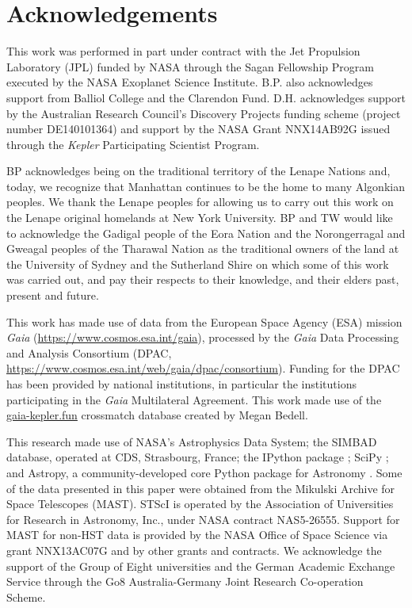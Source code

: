 \documentclass[a4paper,fleqn,usenatbib]{mnras}
\begin{document}
\section*{Acknowledgements} %

This work was performed in part under contract with the Jet Propulsion Laboratory (JPL) funded by NASA through the Sagan Fellowship Program executed by the NASA Exoplanet Science Institute. B.P. also acknowledges support from Balliol College and the Clarendon Fund. D.H. acknowledges support by the Australian Research Council's Discovery Projects funding scheme (project number DE140101364) and support by the NASA Grant NNX14AB92G issued through the \emph{Kepler} Participating Scientist Program.

BP acknowledges being on the traditional territory of the Lenape Nations and, today, we recognize that Manhattan continues to be the home to many Algonkian peoples. We thank the Lenape peoples for allowing us to carry out this work on the Lenape original homelands at New York University. BP and TW would like to acknowledge the Gadigal people of the Eora Nation and the Norongerragal and Gweagal peoples of the Tharawal Nation as the traditional owners of the land at the University of Sydney and the Sutherland Shire on which some of this work was carried out, and pay their respects to their knowledge, and their elders past, present and future.

This work has made use of data from the European Space Agency (ESA) mission
{\it Gaia} (\url{https://www.cosmos.esa.int/gaia}), processed by the {\it Gaia}
Data Processing and Analysis Consortium (DPAC,
\url{https://www.cosmos.esa.int/web/gaia/dpac/consortium}). Funding for the DPAC
has been provided by national institutions, in particular the institutions
participating in the {\it Gaia} Multilateral Agreement. This work made use of the \url{gaia-kepler.fun} crossmatch database created by Megan Bedell.

This research made use of NASA's Astrophysics Data System; the SIMBAD database, operated at CDS, Strasbourg, France; the IPython package \citep{PER-GRA:2007}; SciPy \citep{jones_scipy_2001}; and Astropy, a community-developed core Python package for Astronomy \citep{2013A&A...558A..33A}. Some of the data presented in this paper were obtained from the Mikulski Archive for Space Telescopes (MAST). STScI is operated by the Association of Universities for Research in Astronomy, Inc., under NASA contract NAS5-26555. Support for MAST for non-HST data is provided by the NASA Office of Space Science via grant NNX13AC07G and by other grants and contracts. We acknowledge the support of the Group of Eight universities and the German Academic Exchange Service through the Go8 Australia-Germany Joint Research Co-operation Scheme. 
\end{document}
